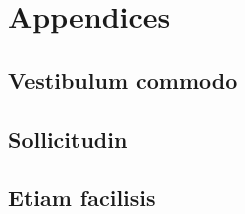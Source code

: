 \part{Appendices}
\newpage
\chapter{Vestibulum commodo} \label{ch:commodo}

\newpage
\chapter{Sollicitudin} \label{ch:sollicitudin}

\newpage
\chapter{Etiam facilisis} \label{ch:etiam}

\newpage
\listoffigures
\listoftables


